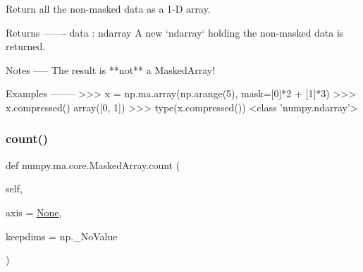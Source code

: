 \begin{DoxyVerb}Return all the non-masked data as a 1-D array.

Returns
-------
data : ndarray
    A new `ndarray` holding the non-masked data is returned.

Notes
-----
The result is **not** a MaskedArray!

Examples
--------
>>> x = np.ma.array(np.arange(5), mask=[0]*2 + [1]*3)
>>> x.compressed()
array([0, 1])
>>> type(x.compressed())
<class 'numpy.ndarray'>\end{DoxyVerb}
 \mbox{\label{classnumpy_1_1ma_1_1core_1_1MaskedArray_a42082174d873c594f55f3fb0e7751855}} 
\subsubsection{\texorpdfstring{count()}{count()}}
{\footnotesize\ttfamily def numpy.\+ma.\+core.\+Masked\+Array.\+count (\begin{DoxyParamCaption}\item[{}]{self,  }\item[{}]{axis = {\ttfamily \hyperlink{namespacenumpy_1_1ma_1_1core_a647ee1848dfa3692fe35a663a2aa40b3}{None}},  }\item[{}]{keepdims = {\ttfamily np.\+\_\+NoValue} }\end{DoxyParamCaption})}

